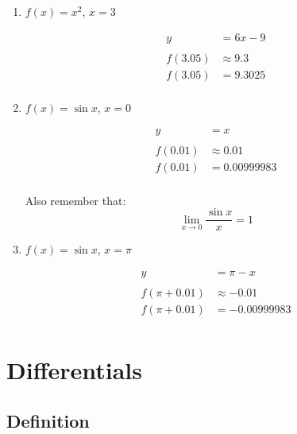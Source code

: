 \documentclass[letterpaper, landscape]{exam}
\begin{document}
  \begin{enumerate}
    \item $f(x) = x^2$, $x = 3$
      \begin{solution}
        \begin{align*}
          y       & = 6x - 9 \\
          \\
          f(3.05) & \approx 9.3 \\
          f(3.05) & = 9.3025 \\
        \end{align*}
      \end{solution}

    \item $f(x) = \sin x$, $x = 0$
      \begin{solution}
        \begin{align*}
          y       & = x \\
          \\
          f(0.01) & \approx 0.01 \\
          f(0.01) & = 0.00999983 \\
        \end{align*}

        Also remember that:
        \[
          \lim_{x \to 0} \frac{\sin x}{x} = 1
        \]

      \end{solution}

    \item $f(x) = \sin x$, $x = \pi$
      \begin{solution}
        \begin{align*}
          y             & = \pi - x \\
          \\
          f(\pi + 0.01) & \approx - 0.01 \\
          f(\pi + 0.01) & = -0.00999983 \\
        \end{align*}
      \end{solution}

  \end{enumerate}

  \section{Differentials} %
  
  \subsection{Definition} %
  
\end{document}
